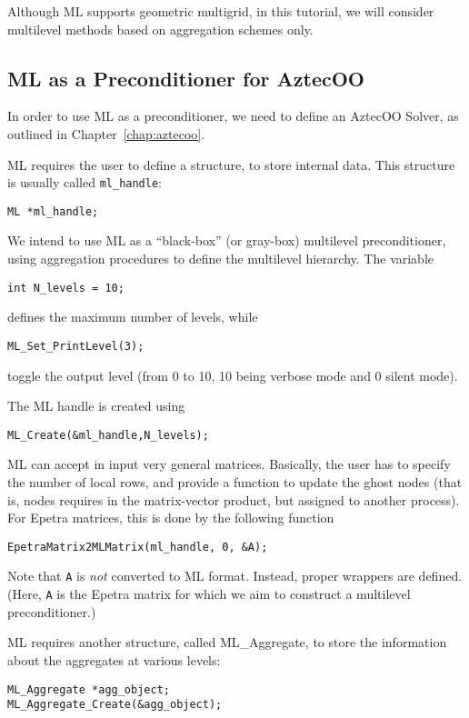 \begin{remark}
  Although ML supports geometric multigrid, in this tutorial, we will
  consider multilevel methods based on aggregation schemes only.
\end{remark}


\subsection{ML as a Preconditioner for AztecOO}
\label{sec:ml_prec}

In order to use ML as a preconditioner, we need to define an
AztecOO Solver, as outlined in Chapter~\ref{chap:aztecoo}. 

ML requires the user to define a structure, to store internal data. This
structure is usually called \verb!ml_handle!:
\begin{verbatim}
ML *ml_handle;
\end{verbatim}

We intend to use ML as a ``black-box'' (or gray-box) multilevel
preconditioner, using aggregation procedures to define the multilevel
hierarchy. The variable
\begin{verbatim}
int N_levels = 10;
\end{verbatim}
defines the maximum number of levels, while
\begin{verbatim}
ML_Set_PrintLevel(3);
\end{verbatim}
toggle the output level (from 0 to 10, 10 being verbose mode and 0
silent mode).

The ML handle is created using
\begin{verbatim}
ML_Create(&ml_handle,N_levels);
\end{verbatim}
ML can accept in input very general matrices. Basically, the user has to
specify the number of local rows, and provide a function to update the
ghost nodes (that is, nodes requires in the matrix-vector product, but
assigned to another process). For Epetra matrices, this is done by the
following function
\begin{verbatim}
EpetraMatrix2MLMatrix(ml_handle, 0, &A);
\end{verbatim}
Note that \verb!A! is {\sl not} converted to ML format. Instead, proper
wrappers are defined.  (Here, \verb!A! is the Epetra matrix for which we
aim to construct a multilevel preconditioner.)

ML requires another structure, called ML\_Aggregate, to store the
information about the aggregates at various levels:
\begin{verbatim}
ML_Aggregate *agg_object;
ML_Aggregate_Create(&agg_object);
\end{verbatim}

